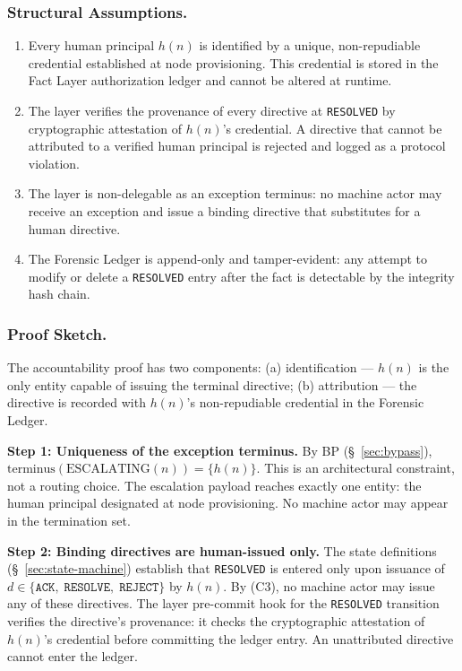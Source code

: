 \subsubsection{Structural Assumptions.}

\begin{enumerate}
\item[(C1)] Every human principal $h(n)$ is identified by a unique, non-repudiable credential established at node provisioning. This credential is stored in the Fact Layer authorization ledger and cannot be altered at runtime.
\item[(C2)] The \fact{} layer verifies the provenance of every directive at \texttt{RESOLVED} by cryptographic attestation of $h(n)$'s credential. A directive that cannot be attributed to a verified human principal is rejected and logged as a protocol violation.
\item[(C3)] The \purpose{} layer is non-delegable as an exception terminus: no machine actor may receive an exception and issue a binding directive that substitutes for a human directive.
\item[(C4)] The Forensic Ledger is append-only and tamper-evident: any attempt to modify or delete a \texttt{RESOLVED} entry after the fact is detectable by the integrity hash chain.
\end{enumerate}

\subsubsection{Proof Sketch.}

The accountability proof has two components: (a) identification — $h(n)$ is the only entity capable of issuing the terminal directive; (b) attribution — the directive is recorded with $h(n)$'s non-repudiable credential in the Forensic Ledger.

\medskip
\noindent\textbf{Step 1: Uniqueness of the exception terminus.} By BP (\S~\ref{sec:bypass}), $\text{terminus}(\text{ESCALATING}(n)) = \{h(n)\}$. This is an architectural constraint, not a routing choice. The escalation payload reaches exactly one entity: the human principal designated at node provisioning. No machine actor may appear in the termination set.

\medskip
\noindent\textbf{Step 2: Binding directives are human-issued only.} The state definitions (\S~\ref{sec:state-machine}) establish that \texttt{RESOLVED} is entered only upon issuance of $d \in \{\texttt{ACK},\;\texttt{RESOLVE},\;\texttt{REJECT}\}$ by $h(n)$. By (C3), no machine actor may issue any of these directives. The \fact{} layer pre-commit hook for the \texttt{RESOLVED} transition verifies the directive's provenance: it checks the cryptographic attestation of $h(n)$'s credential before committing the ledger entry. An unattributed directive cannot enter the ledger.

